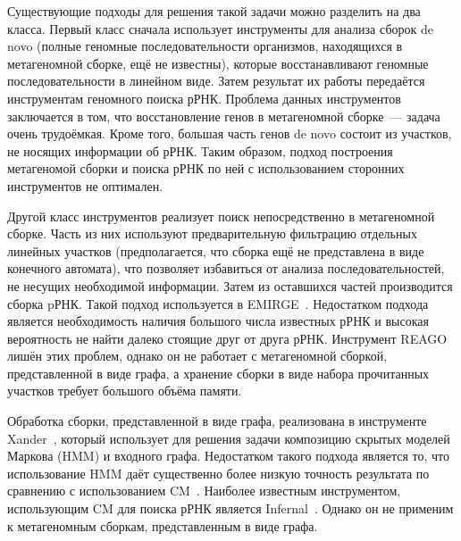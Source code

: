 Существующие подходы для решения такой задачи можно разделить на два класса. Первый класс сначала использует инструменты для анализа сборок de novo (полные геномные последовательности организмов, находящихся в метагеномной сборке, ещё не известны), которые восстанавливают геномные последовательности в линейном виде. Затем результат их работы передаётся инструментам геномного поиска рРНК. Проблема данных инструментов заключается в том, что восстановление генов в метагеномной сборке~--- задача очень трудоёмкая. Кроме того, большая часть генов de novo состоит из участков, не носящих информации об рРНК. Таким образом, подход построения метагеномой сборки и поиска рРНК по ней с использованием сторонних инструментов не оптимален. 

Другой класс инструментов реализует поиск непосредственно в метагеномной сборке. Часть из них используют предварительную фильтрацию отдельных линейных участков (предполагается, что сборка ещё не представлена в виде конечного автомата), что позволяет избавиться от анализа последовательностей, не несущих необходимой информации. Затем из оставшихся частей производится сборка pРНК. Такой подход используется в EMIRGE~\cite{Emirge}. Недостатком подхода является необходимость наличия большого числа известных рРНК и высокая вероятность не найти далеко стоящие друг от друга рРНК. Инструмент REAGO лишён этих проблем, однако он не работает с метагеномной сборкой, представленной в виде графа, а хранение сборки в виде набора прочитанных участков требует большого объёма памяти.

Обработка сборки, представленной в виде графа, реализована в инструменте Xander~\cite{Wang2015}, который использует для решения задачи композицию скрытых моделей Маркова (HMM) и входного графа. Недостатком такого подхода является то, что использование HMM даёт существенно более низкую точность результата по сравнению с использованием CM~\cite{EddyComputationalRNA}. Наиболее известным инструментом, использующим CM для поиска рРНК является Infernal~\cite{Infernal}. Однако он не применим к метагеномным сборкам, представленным в виде графа.

